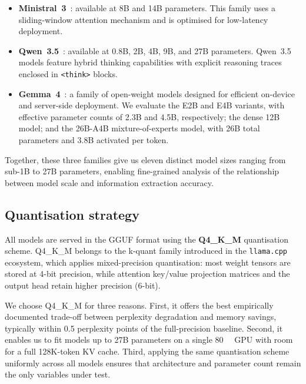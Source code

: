 \begin{itemize}
  \item \textbf{Ministral~3}~\cite{liu2026ministral}: available at \num{8}B and \num{14}B parameters. This
    family uses a sliding-window attention mechanism and is optimised for low-latency deployment.
  \item \textbf{Qwen~3.5}~\cite{qwen3.5}: available at \num{0.8}B, \num{2}B, \num{4}B, \num{9}B, and
    \num{27}B parameters. Qwen~3.5 models feature hybrid thinking capabilities with explicit reasoning traces
    enclosed in \texttt{<think>} blocks.
  \item \textbf{Gemma~4}~\cite{gemmateam2026gemma4technicalreport}: a family of open-weight models designed
    for efficient on-device and server-side deployment. We evaluate the E2B and E4B variants, with effective
    parameter counts of \num{2.3}B and \num{4.5}B, respectively; the dense \num{12}B model; and the 26B-A4B
    mixture-of-experts model, with \num{26}B total parameters and \num{3.8}B activated per token.
\end{itemize}

Together, these three families give us eleven distinct model sizes ranging from sub-\num{1}B to \num{27}B
parameters, enabling fine-grained analysis of the relationship between model scale and information extraction accuracy.

\subsection{Quantisation strategy}

All models are served in the GGUF format \cite{llamacpp} using the \textbf{Q4\_K\_M} quantisation scheme.
Q4\_K\_M belongs to the k-quant family introduced in the \texttt{llama.cpp} \cite{llamacpp} ecosystem,
which applies mixed-precision quantisation: most weight tensors are stored at \num{4}-bit precision, while
attention key/value projection matrices and the output head retain higher precision (\num{6}-bit).

We choose Q4\_K\_M for three reasons. First, it offers the best empirically documented trade-off between
perplexity degradation and memory savings, typically within \num{0.5} perplexity points of the full-precision
baseline. Second, it enables us to fit models up to \num{27}B parameters on a single \qty{80}{\giga\byte} GPU
with room for a full \num{128}K-token KV cache. Third, applying the same quantisation scheme uniformly across
all models ensures that architecture and parameter count remain the only variables under test.

